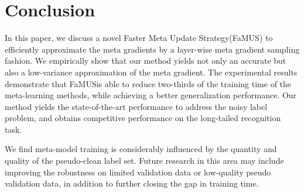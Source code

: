 \documentclass[final]{cvpr}
\newcommand{\methodname}{Faster Meta Update Strategy}
\newcommand{\methodnameabbre}{FaMUS}
\begin{document}
\section{Conclusion}
In this paper, we discuss a novel \methodname\space(\methodnameabbre) to efficiently approximate the meta gradients by a layer-wise meta gradient sampling fashion.
We empirically show that our method yields not only an accurate but also a low-variance approximation of the meta gradient. The experimental results demonstrate that \methodnameabbre\space is able to reduce two-thirds of the training time of the meta-learning methods, while achieving a better generalization performance. Our method yields the state-of-the-art performance to address the noisy label problem, and obtains competitive performance on the long-tailed recognition task.

We find meta-model training is considerably influenced by the quantity and quality of the pseudo-clean label set. Future research in this area may include improving the robustness on limited validation data or low-quality pseudo validation data, in addition to further closing the gap in training time.
 

\clearpage


{\small
\balance


\balance
}
\end{document}
